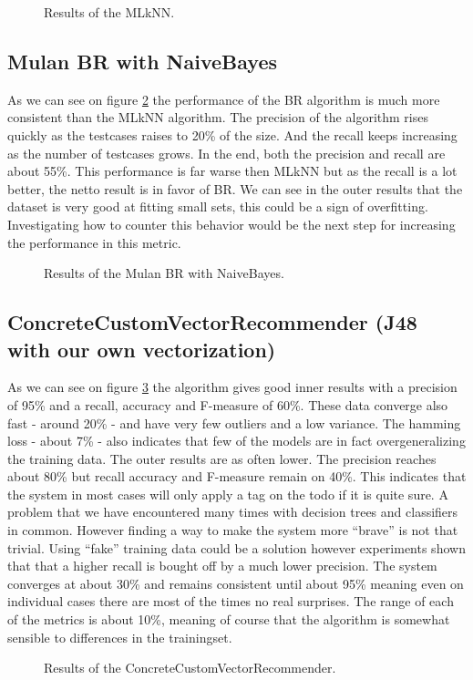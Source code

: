 \documentclass[a4paper,titlepage]{article}
\begin{document}
\begin{figure}
\centering
{}
\caption{Results of the MLkNN.}
\label{fig:br}
\end{figure}

\subsection{Mulan BR with NaiveBayes}
As  we can see on figure \ref{fig:br} the performance of the BR algorithm is much more consistent than the MLkNN algorithm. The precision of the algorithm rises quickly as the testcases raises to 20\% of the size. And the recall keeps increasing as the number of testcases grows. In the end, both the precision and recall are about 55\%. This performance is far warse then MLkNN but as the recall is a lot better, the netto result is in favor of BR. We can see in the outer results that the dataset is very good at fitting small sets, this could be a sign of overfitting. Investigating how to counter this behavior would be the next step for increasing the performance in this metric.

\begin{figure}
\centering
{}
\caption{Results of the Mulan BR with NaiveBayes.}
\label{fig:br}
\end{figure}

\subsection{ConcreteCustomVectorRecommender (J48 with our own vectorization)}
As we can see on figure \ref{fig:ccvrresults} the algorithm gives good inner results with a precision of 95\% and a recall, accuracy and F-measure of 60\%. These data converge also fast - around 20\% - and have very few outliers and a low variance. The hamming loss - about 7\% - also indicates that few of the models are in fact overgeneralizing the training data. The outer results are as often lower. The precision reaches about 80\% but recall accuracy and F-measure remain on 40\%. This indicates that the system in most cases will only apply a tag on the todo if it is quite sure. A problem that we have encountered many times with decision trees and classifiers in common. However finding a way to make the system more ``brave'' is not that trivial. Using ``fake'' training data could be a solution however experiments shown that that a higher recall is bought off by a much lower precision. The system converges at about 30\% and remains consistent until about 95\% meaning even on individual cases there are most of the times no real surprises. The range of each of the metrics is about 10\%, meaning of course that the algorithm is somewhat sensible to differences in the trainingset.
\begin{figure}
\centering
{}
\caption{Results of the ConcreteCustomVectorRecommender.}
\label{fig:ccvrresults}
\end{figure}
\end{document}
